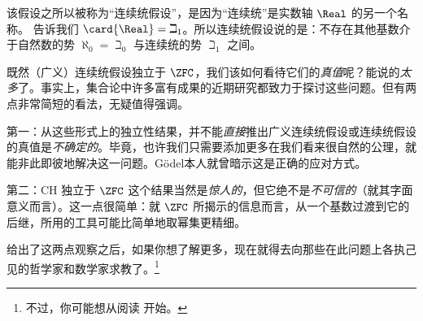\documentclass[../../../include/open-logic-section]{subfiles}
\begin{document}
该假设之所以被称为“连续统假设”，是因为“连续统”是实数轴 $\Real$ 的另一个名称。 告诉我们 $\card{\Real} = \beth_1$。所以连续统假设说的是：不存在其他基数介于自然数的势 $\aleph_0 = \beth_0$ 与连续统的势 $\beth_1$ 之间。

既然（广义）连续统假设独立于 $\ZFC$，我们该如何看待它们的\emph{真值}呢？能说的\emph{太多}了。事实上，集合论中许多富有成果的近期研究都致力于探讨这些问题。但有两点非常简短的看法，无疑值得强调。

第一：从这些形式上的独立性结果，并不能\emph{直接}推出广义连续统假设或连续统假设的真值是\emph{不确定的}。毕竟，也许我们只需要添加更多在我们看来很自然的公理，就能非此即彼地解决这一问题。Gödel本人就曾暗示这是正确的应对方式。

第二：CH 独立于 $\ZFC$ 这个结果当然是\emph{惊人的}，但它绝不是\emph{不可信的}（就其字面意义而言）。这一点很简单：就 $\ZFC$ 所揭示的信息而言，从一个基数过渡到它的后继，所用的工具可能比简单地取幂集更精细。

给出了这两点观察之后，如果你想了解更多，现在就得去向那些在此问题上各执己见的哲学家和数学家求教了。\footnote{不过，你可能想从阅读 \citet[\S15.6]{Potter2004} 开始。}
\end{document}
